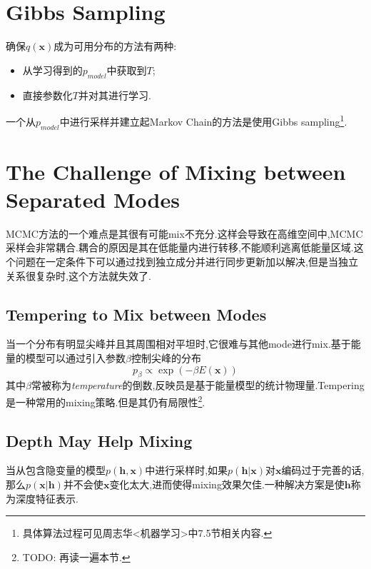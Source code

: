 \section{Gibbs Sampling}

确保$q(\mathbf x)$成为可用分布的方法有两种:
\begin{itemize}
    \item 从学习得到的$p_{model}$中获取到$T$;
    \item 直接参数化$T$并对其进行学习.
\end{itemize}

一个从$p_{model}$中进行采样并建立起Markov Chain的方法是使用Gibbs sampling\footnote{具体算法过程可见周志华<机器学习>中7.5节相关内容.}.

\section{The Challenge of Mixing between Separated Modes}

MCMC方法的一个难点是其很有可能mix不充分.这样会导致在高维空间中,MCMC采样会非常耦合.耦合的原因是其在低能量内进行转移,不能顺利逃离低能量区域.这个问题在一定条件下可以通过找到独立成分并进行同步更新加以解决,但是当独立关系很复杂时,这个方法就失效了.

\subsection{Tempering to Mix between Modes}

当一个分布有明显尖峰并且其周围相对平坦时,它很难与其他mode进行mix.基于能量的模型可以通过引入参数$\beta$控制尖峰的分布
\begin{equation}
p_\beta\propto\exp(-\beta E(\mathbf x))
\end{equation}
其中$\beta$常被称为\textit{temperature}的倒数,反映员是基于能量模型的统计物理量.Tempering是一种常用的mixing策略.但是其仍有局限性\footnote{TODO: 再读一遍本节.}.

\subsection{Depth May Help Mixing}

当从包含隐变量的模型$p(\mathbf{h,x})$中进行采样时,如果$p(\mathbf{h|x})$对$\mathbf x$编码过于完善的话,那么$p(\mathbf{x|h})$并不会使$\mathbf x$变化太大,进而使得mixing效果欠佳.一种解决方案是使$\mathbf h$称为深度特征表示.